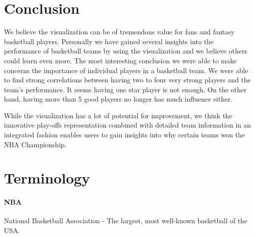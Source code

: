 \documentclass[]{sigchi}
\begin{document}
\section{Conclusion}\label{sec:conclusion}
We believe the visualization can be of tremendous value for fans
and fantasy basketball players. Personally we have gained several insights into
the performance of basketball teams by using the visualization and we believe
others could learn even more. 
The most interesting conclusion we were able to make concerns the importance of
individual players in a basketball team. We were able to find strong
correlations between having two to four very strong players and the team's
performance. It seems having one star player is not enough. On the other hand,
having more than 5 good players no longer has much influence either. 

While the visualization has a lot of potential for improvement, we think the
innovative play-offs representation combined with detailed team information in
an integrated fashion enables users to gain insights into why certain teams won the NBA Championship.

%
%
%
%
%
\balance{}

%

\printbibliography

\appendix
\section{Terminology}\label{sec:terminology}

\paragraph{NBA} National Basketball Association - The largest, most well-known
basketball of the USA.
\end{document}
